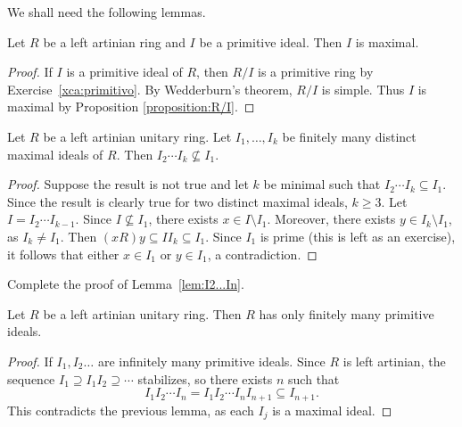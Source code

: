 We shall need the following lemmas.

\begin{lemma}
\label{lem:primitive=>maximal}
    Let $R$ be a left artinian ring and $I$ be a primitive ideal. 
    Then $I$ is maximal. 
\end{lemma}

\begin{proof}
    If $I$ is a primitive ideal of $R$, then $R/I$ is a primitive ring
    by Exercise~\ref{xca:primitivo}. By Wedderburn's theorem, $R/I$ is
    simple. Thus $I$ is maximal by Proposition \ref{proposition:R/I}. 
\end{proof}

\begin{lemma}
\label{lem:I2...In}
    Let $R$ be a left artinian unitary ring.
    Let $I_1,\dots,I_k$ be finitely many distinct maximal ideals of $R$. 
    Then $I_2\cdots I_k\not\subseteq I_1$.   
\end{lemma}

\begin{proof}
    Suppose the result is not true and let $k$ be minimal
    such that $I_2\cdots I_k\subseteq I_1$. Since the result is clearly
    true for two distinct maximal ideals, $k\geq3$. Let $I=I_2\cdots I_{k-1}$. 
    Since $I\not\subseteq I_1$, there exists $x\in I\setminus I_1$. Moreover,  
    there exists $y\in I_k\setminus I_1$, as 
    $I_k\ne I_1$. 
    Then 
    $(xR)y\subseteq II_k\subseteq I_1$. Since $I_1$ is prime (this is left as an exercise), 
    it follows that either $x\in I_1$ or $y\in I_1$, a contradiction.   
\end{proof}

\begin{exercise}
    Complete the proof of Lemma~\ref{lem:I2...In}. 
\end{exercise}

\begin{lemma}
\label{lem:Rartinian_finite_primitives}
    Let $R$ be a left artinian unitary ring. Then $R$ has only 
    finitely many primitive ideals.
\end{lemma}

\begin{proof}
    If $I_1,I_2\dots$ are infinitely many primitive ideals. 
    Since $R$ is left artinian, the sequence 
    $I_1\supseteq I_1I_2\supseteq\cdots$ stabilizes, so there
    exists $n$ such that 
    \[
    I_1I_2\cdots I_n=I_1I_2\cdots I_nI_{n+1}\subseteq I_{n+1}.
    \]
    This contradicts the previous lemma, 
    as each $I_j$ is a maximal ideal. 
\end{proof}

